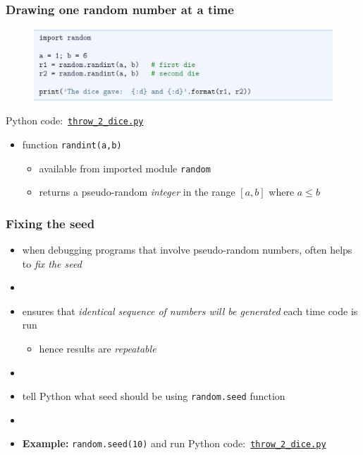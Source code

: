 \documentclass[english,14pt]{beamer}
\newcommand\red[1]{{\color{red} #1}}
\begin{document}

\begin{frame}[fragile]

\frametitle{Drawing \textbf{one} random number at a time}

\begin{figure}[ht]
	\centering
	\includegraphics[width=\textwidth]{figures/LLp54}
\end{figure}

Python code:~\href{https://github.com/slgit/prog4comp_2/blob/master/py36-src/throw_2_dice.py}{\texttt{throw\_2\_dice.py}}

\begin{itemize}
	\item function \texttt{randint(a,b)}
	\begin{itemize}
		\item available from imported module \texttt{random} %
		\item returns a pseudo-random \emph{integer} in the range $[a,b]$ where $a \leq b$
	\end{itemize}
\end{itemize}

\end{frame}


\begin{frame}[fragile]

\frametitle{Fixing the seed}

\begin{itemize}
	\item when debugging programs that involve pseudo-random numbers, often helps to \red{\emph{fix the seed}}
	\item[]
	\item ensures that \emph{identical sequence of numbers will be generated} each time code is run
	\begin{itemize}
		\item hence results are \emph{repeatable}
	\end{itemize}
	\item[]
	\item tell Python what seed should be using \texttt{random.seed} function
	\item[]
	\item \textbf{Example:} \texttt{random.seed(10)} and run Python code:~\href{https://github.com/slgit/prog4comp_2/blob/master/py36-src/throw_2_dice.py}{\texttt{throw\_2\_dice.py}}
\end{itemize}

\end{frame}
\end{document}
